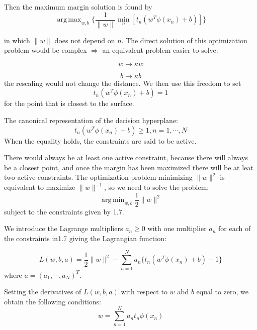 \documentclass[twoside]{article}
\DeclareMathOperator*{\argmax}{arg\,max}
\DeclareMathOperator*{\argmin}{arg\,min}
\begin{document}
Then the maximum margin solution is found by
\begin{equation}
\argmax_{w, b} \{ \frac{1}{\lVert w \rVert} \min_n[t_n(w^T \phi(x_n)+b)]\}
\end{equation}

in which $\lVert w \rVert$ does not depend on $n$.
The direct solution of this optimization problem would be complex $\Rightarrow$ an equivalent problem easier to solve:

\begin{equation}
w \rightarrow \kappa w
\end{equation}

\begin{equation}
b \rightarrow \kappa b
\end{equation}
the rescaling would not change the distance.
We then use this freedom to set 
\begin{equation}
t_n(w^T \phi(x_n)+b)=1
\end{equation}
for the point that is closest to the surface.  

The canonical representation of the decision hyperplane:
\begin{equation}
t_n(w^T \phi(x_n)+b) \geq 1,   n = 1,\cdots, N
\end{equation}
When the equality holds, the constraints are said to be active.

There would always be at least one active constraint, because there will always be a closest point, and once the margin has been maximized there will be at leat two active constraints.  The optimization problem minimizing $\lVert w \rVert ^2$ is equivalent to maximize $\lVert w \rVert^{-1}$, so we need to solve the problem:
\begin{equation}
\argmin_{w,b} \frac{1}{2} \lVert w \rVert ^2
\end{equation}
subject to the constraints given by 1.7.

We introduce the Lagrange multipliers $a_n \geq 0$ with one multiplier $a_n$ for each of the constraints in1.7 giving the Lagrangian function:

\begin{equation}
L(w,b,a) = \frac{1}{2} \lVert w \rVert^2 - \sum_{n=1}^{N} a_n \{t_n(w^T \phi(x_n)+b)-1\}
\end{equation}
where $a=(a_1,\cdots,a_N)^T$.

Setting the derivatives of $L(w, b, a)$ with respect to $w$ abd $b$ equal to zero, we obtain the following conditions:
\begin{equation}
w= \sum_{n=1}^{N} a_n t_n \phi(x_n)
\end{equation}
\end{document}
